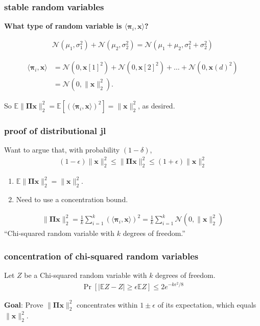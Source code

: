 \documentclass[compress]{beamer}
\newcommand{\bs}[1]{\boldsymbol{#1}}
\newcommand{\bv}[1]{\mathbf{#1}}
\newcommand{\E}{\mathbb{E}}
\begin{document}
\begin{frame}[t]
	\frametitle{stable random variables}
	\textbf{What type of random variable is $\langle\bs{\pi}_i,\bv{x}\rangle$?}
	\begin{fact}
		\begin{align*}
			\mathcal{N}(\mu_1, \sigma_1^2) + \mathcal{N}(\mu_2, \sigma_2^2) =  \mathcal{N}(\mu_1 + \mu_2, \sigma_1^2 + \sigma_2^2)
		\end{align*}
	\end{fact}
	\begin{align*}
		\langle\bs{\pi}_i,\bv{x}\rangle &= \mathcal{N}(0,\bv{x}[1]^2) + \mathcal{N}(0,\bv{x}[2]^2) + \ldots + \mathcal{N}(0,\bv{x}(d)^2) \\ &= \mathcal{N}(0,\|\bv{x}\|_2^2). 
	\end{align*}
	
	So $\E \|\bs{\Pi} \bv{x} \|_2^2 = \E\left[\left(\langle\bs{\pi}_i,\bv{x}\rangle\right)^2 \right] = \|\bv{x}\|_2^2$, as desired.
\end{frame}

\begin{frame}
	\frametitle{proof of distributional jl}
	Want to argue that, with probability $(1-\delta)$,
	\begin{align*}
		(1-\epsilon)\|\bv{x}\|_2^2 \leq \|\bs{\Pi}\bv{x}\|_2^2 \leq (1+\epsilon)\|\bv{x}\|_2^2 
	\end{align*}
	
	\begin{enumerate}
		\item $\E \|\bs{\Pi} \bv{x} \|_2^2 = \|\bv{x}\|_2^2$.
		\item Need to use a concentration bound.
	\end{enumerate}
	\begin{align*}
		\|\bs{\Pi} \bv{x} \|_2^2 = \frac{1}{k}\sum_{i=1}^k \left(\langle\bs{\pi}_i,\bv{x}\rangle\right)^2 = \frac{1}{k}\sum_{i=1}^k \mathcal{N}(0,\|\bv{x}\|_2^2)
	\end{align*}
	\alert{``Chi-squared random variable with $k$ degrees of freedom.''}
\end{frame}

\begin{frame}[t]
	\frametitle{concentration of chi-squared random variables}
	\begin{lemma} Let $Z$ be a Chi-squared random variable with $k$ degrees of freedom. 
		\begin{align*}
			\Pr[|\E Z - Z| \geq \epsilon \E Z] \leq 2 e^{-k\epsilon^2/8}
		\end{align*}
	\end{lemma}
	
	\vspace{8em}
	\begin{block}{\vspace*{-3ex}}
		\small \textbf{Goal}: Prove $\|\bs{\Pi} \bv{x} \|_2^2$ concentrates within $1 \pm \epsilon$ of its expectation, which equals $\|\bv{x} \|_2^2$.
	\end{block}
\end{frame}
\end{document}
